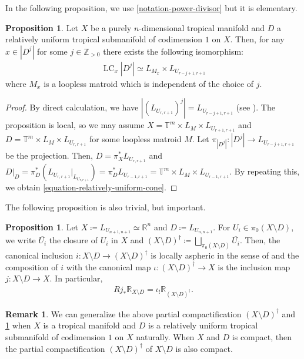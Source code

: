 \documentclass[a4paper,dvipdfmx,reqno,12pt]{amsart}
\theoremstyle{definition}
\newtheorem{proposition}[theorem]{Proposition}
\newtheorem{remark}[theorem]{Remark}
\newcommand{\deq}{\coloneqq}
\newcommand{\opn}[1]{\operatorname{#1}}
\numberwithin{equation}{section}
\begin{document}
In the following proposition, we use
\cref{notation-power-divisor} but it is elementary.
\begin{proposition}
Let $X$ be a purely $n$-dimensional tropical manifold
and $D$ a relatively uniform tropical submanifold of
codimension $1$ on $X$.
Then, for any $x\in |D^{j}|$ for some $j\in \mathbb{Z}_{>0}$
there exists the following isomorphism:
\begin{align}
\label{equation-relatively-uniform-cone}
\opn{LC}_x |D^{j}|\simeq 
L_{M_{x}}
\times L_{U_{r-j+1,r+1}}
\end{align}
where $M_x$ is a loopless matroid which is independent of
the choice of $j$.
\end{proposition}
\begin{proof}
By direct calculation, we have 
$|(L_{U_{r,r+1}})^{j}|=L_{U_{r-j+1,r+1}}$
(see \cite[Example 3.9]{MR2591823}).
The proposition is local, so we may assume 
$X=\mathbb{T}^{m}\times L_{M}\times L_{U_{r+1,r+1}}$ and 
$D=\mathbb{T}^{m}\times 
L_{M}\times L_{U_{r,r+1}}$
for some loopless matroid $M$.
Let $\pi_{|D^j|} \colon |D^{j}|\to L_{U_{r-j+1,r+1}}$
be the projection.
Then, $D=\pi_{X}^*L_{U_{r,r+1}}$ and 
$D|_D=\pi_D^{*}(L_{U_{r,r+1}}|_{L_{U_{r,r+1}}})
=\pi_D^{*}L_{U_{r-1,r+1}}=
\mathbb{T}^{m}\times L_{M}\times L_{U_{r-1,r+1}}$.
By repeating this, we obtain
\eqref{equation-relatively-uniform-cone}.
\end{proof}

The following proposition is also trivial,
but important.

\begin{proposition}
\label{proposition-cpt-complement}
Let $X\deq L_{U_{n+1,n+1}}\simeq \mathbb{R}^n$ and
$D\deq L_{U_{n,n+1}}$. 
For $U_i\in \pi_0(X\setminus D)$, we write 
$\overline{U_i}$ the closure of $U_i$ in $X$
and $(X\setminus D)^{\dagger}\deq \bigsqcup_{\pi_0(X\setminus D)}
\overline{U_i}$.
Then, the canonical inclusion
$i\colon X\setminus D\to
(X\setminus D)^{\dagger}$ is
locally aspheric in the sense of
\cite[Chapter V. Corollary 1.3.2]{MR3838359} and
the composition of $i$ with
the canonical map $\iota\colon
(X\setminus D)^{\dagger}\to X$ is the inclusion 
map $j\colon X\setminus D\to X$. 
In particular,
\begin{align}
Rj_*\mathbb{R}_{X\setminus D}=\iota_!
\mathbb{R}_{(X\setminus D)^{\dagger}}.
\end{align}

\end{proposition}

\begin{remark}
We can generalize 
the above partial compactification
$(X\setminus D)^{\dagger}$ and 
\cref{proposition-cpt-complement} when
$X$ is a tropical manifold and $D$ is a
relatively uniform tropical submanifold of codimension
$1$ on $X$ naturally.
When $X$ and $D$ is compact, then the partial compactification
$(X\setminus D)^{\dagger}$ of $X\setminus D$
is also compact. 
\end{remark}
\end{document}
